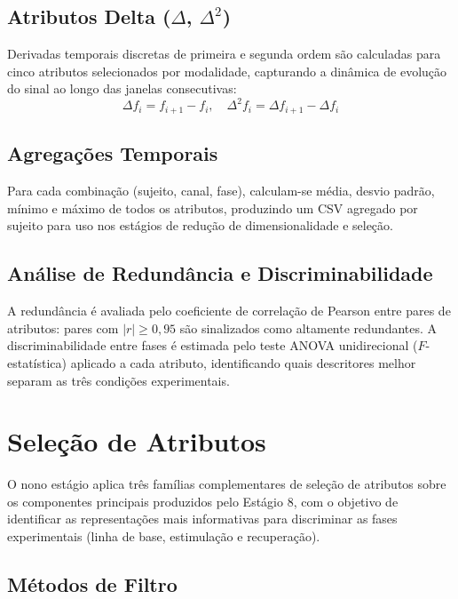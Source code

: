 \subsection{Atributos Delta (\texorpdfstring{$\Delta$}{Delta}, \texorpdfstring{$\Delta^2$}{Delta2})}

Derivadas temporais discretas de primeira e segunda ordem são calculadas para cinco atributos selecionados por modalidade, capturando a dinâmica de evolução do sinal ao longo das janelas consecutivas:
\begin{equation}
    \Delta f_i = f_{i+1} - f_i, \quad \Delta^2 f_i = \Delta f_{i+1} - \Delta f_i
\end{equation}

\subsection{Agregações Temporais}

Para cada combinação (sujeito, canal, fase), calculam-se média, desvio padrão, mínimo e máximo de todos os atributos, produzindo um CSV agregado por sujeito para uso nos estágios de redução de dimensionalidade e seleção.

\subsection{Análise de Redundância e Discriminabilidade}

A redundância é avaliada pelo coeficiente de correlação de Pearson entre pares de atributos: pares com $|r| \geq 0{,}95$ são sinalizados como altamente redundantes. A discriminabilidade entre fases é estimada pelo teste ANOVA unidirecional ($F$-estatística) aplicado a cada atributo, identificando quais descritores melhor separam as três condições experimentais.

\section{Seleção de Atributos}
\label{sec:metodo_selecao}

O nono estágio aplica três famílias complementares de seleção de atributos sobre os componentes principais produzidos pelo Estágio 8, com o objetivo de identificar as representações mais informativas para discriminar as fases experimentais (linha de base, estimulação e recuperação).

\subsection{Métodos de Filtro}

